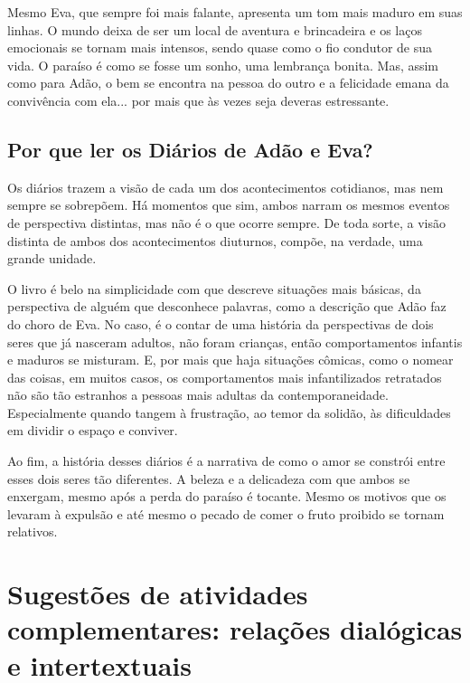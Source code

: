 \documentclass[12pt]{extarticle}
\begin{document}
Mesmo Eva, que sempre foi mais falante, apresenta um tom mais maduro em
suas linhas. O mundo deixa de ser um local de aventura e brincadeira e
os laços emocionais se tornam mais intensos, sendo quase como o fio
condutor de sua vida. O paraíso é como se fosse um sonho, uma lembrança
bonita. Mas, assim como para Adão, o bem se encontra na pessoa do outro
e a felicidade emana da convivência com ela... por mais que às vezes
seja deveras estressante.

\subsection{Por que ler os Diários de Adão e Eva?}

Os diários trazem a visão de cada um dos acontecimentos cotidianos, mas
nem sempre se sobrepõem. Há momentos que sim, ambos narram os mesmos
eventos de perspectiva distintas, mas não é o que ocorre sempre. De toda
sorte, a visão distinta de ambos dos acontecimentos diuturnos, compõe,
na verdade, uma grande unidade.

O livro é belo na simplicidade com que descreve situações mais básicas,
da perspectiva de alguém que desconhece palavras, como a descrição que
Adão faz do choro de Eva. No caso, é o contar de uma história da
perspectivas de dois seres que já nasceram adultos, não foram crianças,
então comportamentos infantis e maduros se misturam. E, por mais que
haja situações cômicas, como o nomear das coisas, em muitos casos, os
comportamentos mais infantilizados retratados não são tão estranhos a
pessoas mais adultas da contemporaneidade. Especialmente quando tangem à
frustração, ao temor da solidão, às dificuldades em dividir o espaço e
conviver.

Ao fim, a história desses diários é a narrativa de como o amor se
constrói entre esses dois seres tão diferentes. A beleza e a delicadeza
com que ambos se enxergam, mesmo após a perda do paraíso é tocante.
Mesmo os motivos que os levaram à expulsão e até mesmo o pecado de comer
o fruto proibido se tornam relativos.


\section{Sugestões de atividades complementares: relações dialógicas e
intertextuais}

\end{document}
